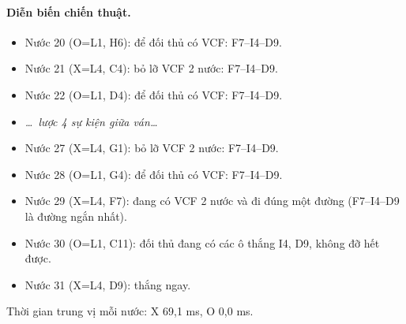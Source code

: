 \paragraph{Diễn biến chiến thuật.}
\begin{itemize}\footnotesize\linespread{1.1}\selectfont
\setlength{\itemsep}{0pt}
  \item Nước 20 (O=L1, H6): để đối thủ có VCF: F7--I4--D9.
  \item Nước 21 (X=L4, C4): bỏ lỡ VCF 2 nước: F7--I4--D9.
  \item Nước 22 (O=L1, D4): để đối thủ có VCF: F7--I4--D9.
  \item[] \emph{\dots\ lược 4 sự kiện giữa ván\dots}
  \item Nước 27 (X=L4, G1): bỏ lỡ VCF 2 nước: F7--I4--D9.
  \item Nước 28 (O=L1, G4): để đối thủ có VCF: F7--I4--D9.
  \item Nước 29 (X=L4, F7): đang có VCF 2 nước và đi đúng một đường (F7--I4--D9 là đường ngắn nhất).
  \item Nước 30 (O=L1, C11): đối thủ đang có các ô thắng I4, D9, không đỡ hết được.
  \item Nước 31 (X=L4, D9): thắng ngay.
\end{itemize}
Thời gian trung vị mỗi nước: X 69,1 ms, O 0,0 ms.
\clearpage

